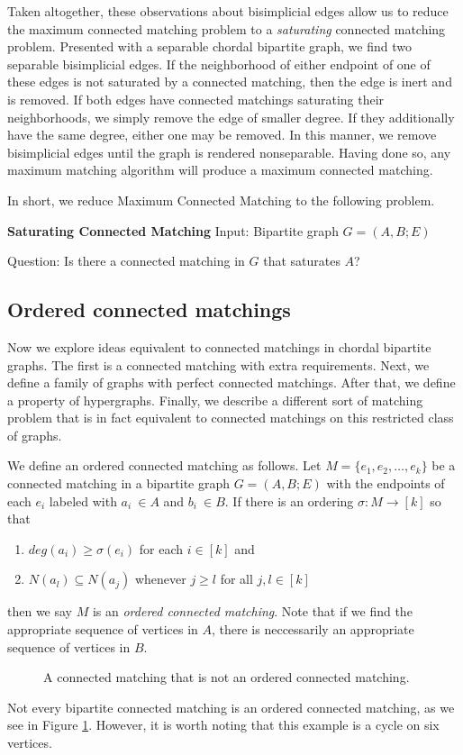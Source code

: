 Taken altogether, these observations about bisimplicial edges allow us to reduce the maximum connected matching problem to a {\it saturating} connected matching problem.  Presented with a separable chordal bipartite graph, we find two separable bisimplicial edges.  If the neighborhood of either endpoint of one of these edges is not saturated by a connected matching, then the edge is inert and is removed.  If both edges have connected matchings saturating their neighborhoods, we simply remove the edge of smaller degree.  If they additionally have the same degree, either one may be removed.  In this manner, we remove bisimplicial edges until the graph is rendered nonseparable.  Having done so, any maximum matching algorithm will produce a maximum connected matching. 

In short, we reduce Maximum Connected Matching to the following problem.
\begin{framed}\noindent\textbf{Saturating Connected Matching}
	\vskip 0.5cm
	\noindent Input: Bipartite graph $G = (A,B;E)$
	
	\noindent Question: Is there a connected matching in $G$ that saturates $A$?
\end{framed}
\subsection{Ordered connected matchings}

Now we explore ideas equivalent to connected matchings in chordal bipartite graphs.  The first is a connected matching with extra requirements.  Next, we define a family of graphs with perfect connected matchings.  After that, we define a property of hypergraphs.  Finally, we describe a different sort of matching problem that is in fact equivalent to connected matchings on this restricted class of graphs.  

%
We define an ordered connected matching as follows.
	Let $M = \{e_1, e_2, \ldots, e_k\}$ be a connected matching in a bipartite graph $G = (A,B; E)$ with the endpoints of each $e_i$ labeled with $a_i \: \in A$ and $b_i \: \in B$.  If there is an ordering $\sigma : M \rightarrow [k]$ so that 
	\begin{enumerate}
		\item $deg(a_i) \geq \sigma(e_i)$ for each $i\in [k]$ and 
		\item $N(a_l) \subseteq N(a_j)$ whenever $j \geq l$ for all $j,l \in [k]$
	\end{enumerate} 
then we say $M$ is an {\it ordered connected matching}\label{OCM}.
Note that if we find the appropriate sequence of vertices in $A$, there is neccessarily an appropriate sequence of vertices in $B$.  
%
\begin{figure}
	\begin{center}
	
	\end{center}
	\caption{A connected matching that is not an ordered connected matching.}
	\label{c_6}
\end{figure}
%
Not every bipartite connected matching is an ordered connected matching, as we see in Figure \ref{c_6}. 
%
 However, it is worth noting that this example is a cycle on six vertices.  
%

